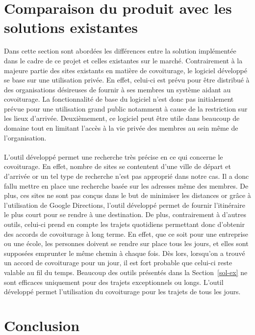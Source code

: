 \documentclass[12pt, a4paper, oneside]{article}
\begin{document}
\section{Comparaison du produit avec les solutions existantes}\label{comp}
    Dans cette section sont abordées les différences entre la solution implémentée dans le cadre de ce projet et celles existantes sur le marché. Contrairement à la majeure partie des sites existants en matière de covoiturage, le logiciel développé se base sur une utilisation privée. En effet, celui-ci est prévu pour être distribué à des organisations désireuses de fournir à ses membres un système aidant au covoiturage. La fonctionnalité de base du logiciel n'est donc pas initialement prévue pour une utilisation grand public notamment à cause de la restriction sur les lieux d'arrivée. Deuxièmement, ce logiciel peut être utile dans beaucoup de domaine tout en limitant l'accès à la vie privée des membres au sein même de l'organisation.\\\\
    \indent L'outil développé permet une recherche très précise en ce qui concerne le covoiturage. En effet, nombre de sites se contentent d'une ville de départ et d'arrivée or un tel type de recherche n'est pas approprié dans notre cas. Il a donc fallu mettre en place une recherche basée sur les adresses même des membres. De plus, ces sites ne sont pas conçus dans le but de minimiser les distances or grâce à l'utilisation de Google Directions, l'outil développé permet de fournir l'itinéraire le plus court pour se rendre à une destination. De plus, contrairement à d'autres outils, celui-ci prend en compte les trajets quotidiens permettant donc d'obtenir des accords de covoiturage à long terme. En effet, que ce soit pour une entreprise ou une école, les personnes doivent se rendre sur place tous les jours, et elles sont supposées emprunter le même chemin à chaque fois. Dès lors, lorsqu'on a trouvé un accord de covoiturage pour un jour, il est fort probable que celui-ci reste valable au fil du temps. Beaucoup des outils présentés dans la Section~\ref{sol-ex} ne sont efficaces uniquement pour des trajets exceptionnels ou longs. L'outil développé permet l'utilisation du covoiturage pour les trajets de tous les jours.
\section{Conclusion}
\end{document}
